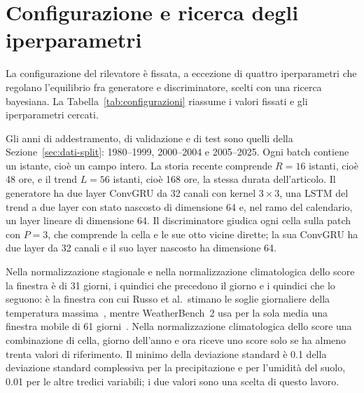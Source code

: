 \section{Configurazione e ricerca degli iperparametri}
\label{sec:exp-configurazioni}

La configurazione del rilevatore è fissata, a eccezione di quattro iperparametri che regolano l'equilibrio fra generatore e discriminatore, scelti con una ricerca bayesiana. La Tabella~\ref{tab:configurazioni} riassume i valori fissati e gli iperparametri cercati.

Gli anni di addestramento, di validazione e di test sono quelli della Sezione~\ref{sec:dati-split}: 1980--1999, 2000--2004 e 2005--2025. Ogni batch contiene un istante, cioè un campo intero. La storia recente comprende $R=16$ istanti, cioè 48 ore, e il trend $L=56$ istanti, cioè 168 ore, la stessa durata dell'articolo. Il generatore ha due layer ConvGRU da 32 canali con kernel $3\times3$, una LSTM del trend a due layer con stato nascosto di dimensione 64 e, nel ramo del calendario, un layer lineare di dimensione 64. Il discriminatore giudica ogni cella sulla patch con $P=3$, che comprende la cella e le sue otto vicine dirette; la sua ConvGRU ha due layer da 32 canali e il suo layer nascosto ha dimensione 64.

Nella normalizzazione stagionale e nella normalizzazione climatologica dello score la finestra è di 31 giorni, i quindici che precedono il giorno e i quindici che lo seguono: è la finestra con cui Russo et al.\ stimano le soglie giornaliere della temperatura massima~\cite{russo2015heatwaves}, mentre WeatherBench~2 usa per la sola media una finestra mobile di 61 giorni~\cite{rasp2024weatherbench2}. Nella normalizzazione climatologica dello score una combinazione di cella, giorno dell'anno e ora riceve uno score solo se ha almeno trenta valori di riferimento. Il minimo della deviazione standard è 0.1 della deviazione standard complessiva per la precipitazione e per l'umidità del suolo, 0.01 per le altre tredici variabili; i due valori sono una scelta di questo lavoro.

